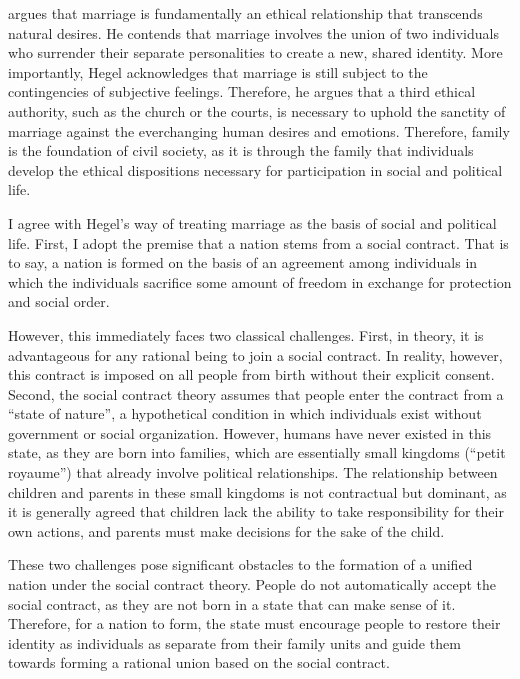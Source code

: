 \documentclass[man,floatsintext]{apa7}
\begin{document}
\textcite{hegelPhilosophyRight1821} argues that marriage is fundamentally an ethical relationship that transcends natural desires. He contends that marriage involves the union of two individuals who surrender their separate personalities to create a new, shared identity. More importantly, Hegel acknowledges that marriage is still subject to the contingencies of subjective feelings. Therefore, he argues that a third ethical authority, such as the church or the courts, is necessary to uphold the sanctity of marriage against the everchanging human desires and emotions. Therefore, family is the foundation of civil society, as it is through the family that individuals develop the ethical dispositions necessary for participation in social and political life.

I agree with Hegel's way of treating marriage as the basis of social and political life. First, I adopt the premise that a nation stems from a social contract. That is to say, a nation is formed on the basis of an agreement among individuals in which the individuals sacrifice some amount of freedom in exchange for protection and social order. 

However, this immediately faces two classical challenges. First, in theory, it is advantageous for any rational being to join a social contract. In reality, however, this contract is imposed on all people from birth without their explicit consent. Second, the social contract theory assumes that people enter the contract from a ``state of nature'', a hypothetical condition in which individuals exist without government or social organization. However, humans have never existed in this state, as they are born into families, which are essentially small kingdoms (``petit royaume'') that already involve political relationships. The relationship between children and parents in these small kingdoms is not contractual but dominant, as it is generally agreed that children lack the ability to take responsibility for their own actions, and parents must make decisions for the sake of the child.

These two challenges pose significant obstacles to the formation of a unified nation under the social contract theory. People do not automatically accept the social contract, as they are not born in a state that can make sense of it. Therefore, for a nation to form, the state must encourage people to restore their identity as individuals as separate from their family units and guide them towards forming a rational union based on the social contract. 
\end{document}

